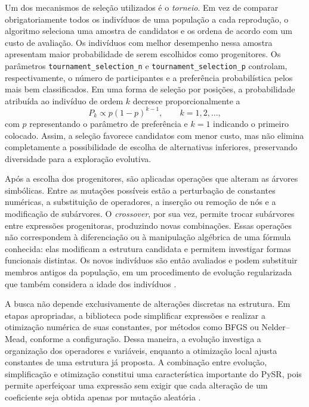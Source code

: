 Um dos mecanismos de seleção utilizados é o \textit{torneio}. Em vez de comparar obrigatoriamente todos os indivíduos de uma população a cada reprodução, o algoritmo seleciona uma amostra de candidatos e os ordena de acordo com um custo de avaliação. Os indivíduos com melhor desempenho nessa amostra apresentam maior probabilidade de serem escolhidos como progenitores. Os parâmetros \texttt{tournament\_selection\_n} e \texttt{tournament\_selection\_p} controlam, respectivamente, o número de participantes e a preferência probabilística pelos mais bem classificados. Em uma forma de seleção por posições, a probabilidade atribuída ao indivíduo de ordem $k$ decresce proporcionalmente a
\begin{equation}
\label{eq:sr_torneio}
P_k\propto p(1-p)^{k-1},\qquad k=1,2,\ldots,
\end{equation}
com $p$ representando o parâmetro de preferência e $k=1$ indicando o primeiro colocado. Assim, a seleção favorece candidatos com menor custo, mas não elimina completamente a possibilidade de escolha de alternativas inferiores, preservando diversidade para a exploração evolutiva.

Após a escolha dos progenitores, são aplicadas operações que alteram as árvores simbólicas. Entre as mutações possíveis estão a perturbação de constantes numéricas, a substituição de operadores, a inserção ou remoção de nós e a modificação de subárvores. O \textit{crossover}, por sua vez, permite trocar subárvores entre expressões progenitoras, produzindo novas combinações. Essas operações não correspondem à diferenciação ou à manipulação algébrica de uma fórmula conhecida: elas modificam a estrutura candidata e permitem investigar formas funcionais distintas. Os novos indivíduos são então avaliados e podem substituir membros antigos da população, em um procedimento de evolução regularizada que também considera a idade dos indivíduos \cite{cranmer2023pysr}.

A busca não depende exclusivamente de alterações discretas na estrutura. Em etapas apropriadas, a biblioteca pode simplificar expressões e realizar a otimização numérica de suas constantes, por métodos como BFGS ou Nelder--Mead, conforme a configuração. Dessa maneira, a evolução investiga a organização dos operadores e variáveis, enquanto a otimização local ajusta constantes de uma estrutura já proposta. A combinação entre evolução, simplificação e otimização constitui uma característica importante do PySR, pois permite aperfeiçoar uma expressão sem exigir que cada alteração de um coeficiente seja obtida apenas por mutação aleatória \cite{cranmer2023pysr}.


